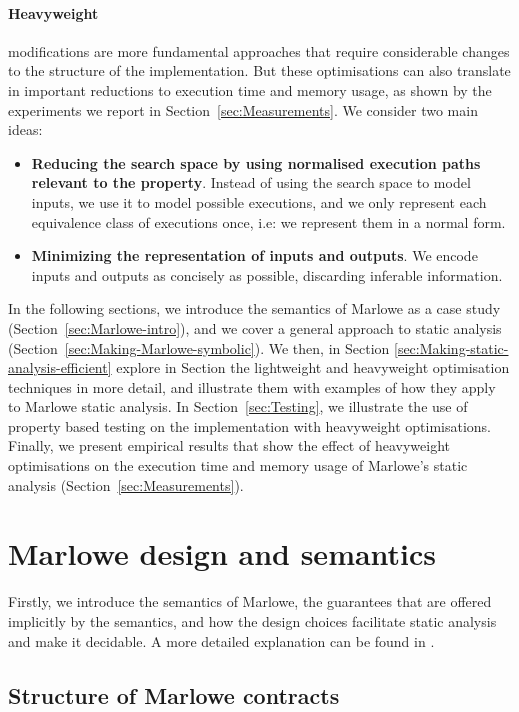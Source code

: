 \documentclass[english,runningheads]{llncs}
\begin{document}
\paragraph*{Heavyweight}

modifications are more fundamental approaches that require considerable
changes to the structure of the implementation. But these optimisations can also
translate in important reductions to execution time and memory usage, as
shown by the experiments we report in Section~\ref{sec:Measurements}.
We consider two main ideas:
\begin{itemize}
\item \textbf{Reducing the search space by using normalised execution paths relevant
to the property}. Instead of using the search space to model inputs, we
use it to model possible executions, and we only
represent each equivalence class of executions once, i.e:
we represent them in a normal form.
\item \textbf{Minimizing the representation of inputs and outputs}. We encode inputs
and outputs as concisely as possible, discarding inferable information.
\end{itemize}
In the following sections, we introduce the semantics of Marlowe as
a case study (Section~\ref{sec:Marlowe-intro}), and we cover a
general approach to static analysis (Section~\ref{sec:Making-Marlowe-symbolic}).
We then, in Section \ref{sec:Making-static-analysis-efficient} explore in Section the lightweight and heavyweight 
optimisation techniques in more detail, and illustrate them with
examples of how they apply to Marlowe static analysis. In Section~\ref{sec:Testing},
we illustrate the use of property based testing on the implementation with
heavyweight optimisations. Finally, we present empirical results that
show the effect of heavyweight optimisations on the execution time
and memory usage of Marlowe's static analysis (Section~\ref{sec:Measurements}).

\section{Marlowe design and semantics\label{sec:Marlowe-intro} }

Firstly, we introduce the semantics of Marlowe, the guarantees
that are offered implicitly by the semantics, and how the design choices
facilitate static analysis and make it decidable. A more detailed
explanation can be found in \cite{marlowe2020}.

\subsection{Structure of Marlowe contracts\label{subsec:Structure-of-Marlowe} }
\end{document}
